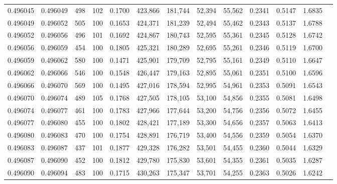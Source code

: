 \begin{tabular}{rrrrrrrrrrrrr}
0.496045 & 0.496049 &   498 & 102 &                                     0.1700 & 423,866 & 181,744 &  52,394 &  55,562 & 0.2341 & 0.5147 & 1.6835 \\
0.496049 & 0.496052 &   505 & 100 &                                     0.1653 & 424,371 & 181,239 &  52,494 &  55,462 & 0.2343 & 0.5137 & 1.6788 \\
0.496052 & 0.496056 &   496 & 101 &                                     0.1692 & 424,867 & 180,743 &  52,595 &  55,361 & 0.2345 & 0.5128 & 1.6742 \\
0.496056 & 0.496059 &   454 & 100 &                                     0.1805 & 425,321 & 180,289 &  52,695 &  55,261 & 0.2346 & 0.5119 & 1.6700 \\
0.496059 & 0.496062 &   580 & 100 &                                     0.1471 & 425,901 & 179,709 &  52,795 &  55,161 & 0.2349 & 0.5110 & 1.6647 \\
0.496062 & 0.496066 &   546 & 100 &                                     0.1548 & 426,447 & 179,163 &  52,895 &  55,061 & 0.2351 & 0.5100 & 1.6596 \\
0.496066 & 0.496070 &   569 & 100 &                                     0.1495 & 427,016 & 178,594 &  52,995 &  54,961 & 0.2353 & 0.5091 & 1.6543 \\
0.496070 & 0.496074 &   489 & 105 &                                     0.1768 & 427,505 & 178,105 &  53,100 &  54,856 & 0.2355 & 0.5081 & 1.6498 \\
0.496074 & 0.496077 &   461 & 100 &                                     0.1783 & 427,966 & 177,644 &  53,200 &  54,756 & 0.2356 & 0.5072 & 1.6455 \\
0.496077 & 0.496080 &   455 & 100 &                                     0.1802 & 428,421 & 177,189 &  53,300 &  54,656 & 0.2357 & 0.5063 & 1.6413 \\
0.496080 & 0.496083 &   470 & 100 &                                     0.1754 & 428,891 & 176,719 &  53,400 &  54,556 & 0.2359 & 0.5054 & 1.6370 \\
0.496083 & 0.496087 &   437 & 101 &                                     0.1877 & 429,328 & 176,282 &  53,501 &  54,455 & 0.2360 & 0.5044 & 1.6329 \\
0.496087 & 0.496090 &   452 & 100 &                                     0.1812 & 429,780 & 175,830 &  53,601 &  54,355 & 0.2361 & 0.5035 & 1.6287 \\
0.496090 & 0.496094 &   483 & 100 &                                     0.1715 & 430,263 & 175,347 &  53,701 &  54,255 & 0.2363 & 0.5026 & 1.6242 \\

\end{tabular}
